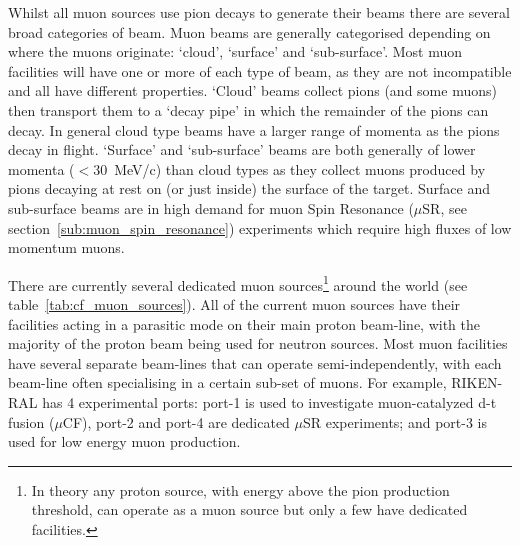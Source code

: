 Whilst all muon sources use pion decays to generate their beams there are several broad categories of beam. Muon beams are generally categorised depending on where the muons originate: `cloud', `surface' and `sub-surface'. Most muon facilities will have one or more of each type of beam, as they are not incompatible and all have different properties. `Cloud' beams collect pions (and some muons) then transport them to a `decay pipe' in which the remainder of the pions can decay. In general cloud type beams have a larger range of momenta as the pions decay in flight. `Surface' and `sub-surface' beams are both generally of lower momenta (\( <30\)~MeV/c) than cloud types as they collect muons produced by pions decaying at rest on (or just inside) the surface of the target. Surface and sub-surface beams are in high demand for muon Spin Resonance (\(\mu\)SR, see section~\ref{sub:muon_spin_resonance}) experiments which require high fluxes of low momentum muons.

There are currently several dedicated muon sources\footnote{In theory any proton source, with energy above the pion production threshold, can operate as a muon source but only a few have dedicated facilities.} around the world (see table~\ref{tab:cf_muon_sources}). All of the current muon sources have their facilities acting in a parasitic mode on their main proton beam-line, with the majority of the proton beam being used for neutron sources. Most muon facilities have several separate beam-lines that can operate semi-independently, with each beam-line often specialising in a certain sub-set of muons. For example, RIKEN-RAL has 4 experimental ports: port-1 is used to investigate muon-catalyzed d-t fusion (\(\mu\)CF), port-2 and port-4 are dedicated \(\mu\)SR experiments; and port-3 is used for low energy muon production.

